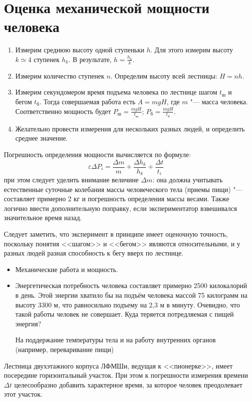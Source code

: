 \section{Оценка механической мощности человека}
\SolveVariant
\begin{enumerate}
    \item Измерим среднюю высоту одной ступеньки \(h\). Для этого измерим высоту \(k \simeq 4\) ступенек \(h_k\). В результате, \(h=\frac{h_k}{k}\).
    \item Измерим количество ступенек \(n\). Определим высоту всей лестницы: \(H=nh\).
    \item Измерим секундомером время подъема человека по лестнице шагом \(t_\text{ш}\) и бегом \(t_\text{б}\). Тогда совершаемая работа есть \(A=mgH\), где \(m\) "--- масса человека. Соответственно мощность будет \(P_\text{ш} = \frac{mgH}{t_\text{ш}}\); \(P_\text{б} = \frac{mgH}{t_\text{б}}\).
    \item Желательно провести измерения для нескольких разных людей, и определить среднее значение.
\end{enumerate}
\MesErrors
Погрешность определения мощности вычисляется по формуле:
\begin{equation}
    \varepsilon \Delta P_i = \frac{\Delta m}{m} + \frac{\Delta h_k}{h_k} + \frac{\Delta t}{t_i}
\end{equation}
при этом следует уделить внимание величине \(\Delta m\): она должна учитывать естественные суточные колебания массы человеческого тела (приемы пищи) "--- составляет примерно 2 кг и погрешность определения массы весами. Также логично ввести дополнительную поправку, если экспериментатор взвешивался значительное время назад.\par
Следует заметить, что эксперимент в принципе имеет оценочную точность, поскольку понятия <<шагом>> и <<бегом>> являются относительными, и у разных людей разная способность к бегу вверх по лестнице.
\SchoolBase
\begin{itemize}
    \item Механические работа и мощность.
\end{itemize}
\AdditionalQuestions
\begin{itemize}
    \item Энергетическая потребность человека составляет примерно 2500 килокалорий в день. Этой энергии хватило бы на подъём человека массой 75 килограмм на высоту 3300 м, что равносильно подъему на 2,3 м в минуту. Очевидно, что такой работы человек не совершает. Куда теряется потредляемая с пищей энергия?\par
    \Answer На поддержание температуры тела и на работу внутренних органов (например, переваривание пищи)
\end{itemize}
\AdditionalNotes
Лестница двухэтажного корпуса ЛФМШи, ведущая к <<пионерке>>, имеет посередине горизонтальный участок. При этом к погрешности измерения времени \(\Delta t\) целесообразно добавить характерное время, за которое человек преодолевает этот участок.
